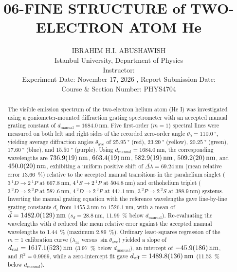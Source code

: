 \documentclass[journal]{IEEEtran}
\begin{document}
\title{06-FINE STRUCTURE of TWO-ELECTRON ATOM He}
\author{IBRAHIM H.I. ABUSHAWISH \\
Istanbul University, Department of Physics \\
Instructor: \\
Experiment Date: November 17, 2026 , Report Submission Date: \\
Course \& Section Number: PHYS4704}


\maketitle

\begin{abstract}
The visible emission spectrum of the two-electron helium atom (He I) was investigated using a goniometer-mounted diffraction grating spectrometer with an accepted manual grating constant of $d_{\text{manual}} = \SI{1684.0}{\nano\meter}$. Five first-order ($m = 1$) spectral lines were measured on both left and right sides of the recorded zero-order angle $\theta_0 = \SI{110.0}{\degree}$, yielding average diffraction angles $\theta_{\text{ave}}$ of $\SI{25.95}{\degree}$ (red), $\SI{23.20}{\degree}$ (yellow), $\SI{20.25}{\degree}$ (green), $\SI{17.60}{\degree}$ (blue), and $\SI{15.50}{\degree}$ (purple). Using $d_{\text{manual}} = \SI{1684.0}{\nano\meter}$, the corresponding wavelengths are $\SI{736.9 \pm 1.9}{\nano\meter}$, $\SI{663.4 \pm 1.9}{\nano\meter}$, $\SI{582.9 \pm 1.9}{\nano\meter}$, $\SI{509.2 \pm 2.0}{\nano\meter}$, and $\SI{450.0 \pm 2.0}{\nano\meter}$, exhibiting a uniform positive shift of $\overline{\Delta\lambda} = \SI{69.24}{\nano\meter}$ (mean relative error \SI{13.66}{\percent}) relative to the accepted manual transitions in the parahelium singlet ($3\,^{1}D \rightarrow 2\,^{1}P$ at $\SI{667.8}{\nano\meter}$, $4\,^{1}S \rightarrow 2\,^{1}P$ at $\SI{504.8}{\nano\meter}$) and orthohelium triplet ($3\,^{3}D \rightarrow 2\,^{3}P$ at $\SI{587.6}{\nano\meter}$, $4\,^{3}D \rightarrow 2\,^{3}P$ at $\SI{447.1}{\nano\meter}$, $3\,^{3}P \rightarrow 2\,^{3}S$ at $\SI{388.9}{\nano\meter}$) systems. Inverting the manual grating equation with the reference wavelengths gave line-by-line grating constants $d_i$ from $\SI{1455.3}{\nano\meter}$ to $\SI{1526.1}{\nano\meter}$, with a mean of $\bar{d} = \SI{1482.0 \pm 12.9}{\nano\meter}$ ($s_d = \SI{28.8}{\nano\meter}$, \SI{11.99}{\percent} below $d_{\text{manual}}$). Re-evaluating the wavelengths with $\bar{d}$ reduced the mean relative error against the accepted manual wavelengths to \SI{1.44}{\percent} (maximum \SI{2.89}{\percent}). Ordinary least-squares regression of the $m = 1$ calibration curve ($\lambda_{\text{lit}}$ versus $\sin\theta_{\text{ave}}$) yielded a slope of $d_{\text{cal}} = \SI{1617.1 \pm 52.3}{\nano\meter}$ (\SI{3.97}{\percent} below $d_{\text{manual}}$), an intercept of $\SI{-45.9 \pm 18.6}{\nano\meter}$, and $R^2 = 0.9969$, while a zero-intercept fit gave $d_{\text{eff}} = \SI{1489.8 \pm 13.6}{\nano\meter}$ (\SI{11.53}{\percent} below $d_{\text{manual}}$).
\end{abstract}
\end{document}
